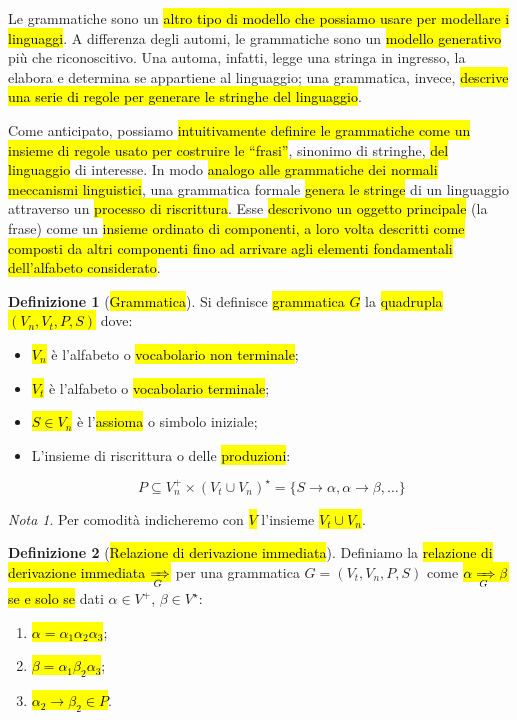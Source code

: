 \documentclass[a4paper,11pt,twoside]{article}
\theoremstyle{plain}
\theoremstyle{definition}
\newtheorem{defn}{Definizione}[section]
\theoremstyle{remark}
\newtheorem*{nota}{Nota}
\newcommand*{\deriv}[1][]{\xRightarrow[#1]{}}
\begin{document}
Le grammatiche sono un \hl{altro tipo di modello che possiamo usare per
modellare i linguaggi}. A differenza degli automi, le grammatiche sono un
\hl{modello generativo} più che riconoscitivo. Una automa, infatti, legge una
stringa in ingresso, la elabora e determina se appartiene al linguaggio; una
grammatica, invece, \hl{descrive una serie di regole per generare le stringhe
del linguaggio}.

Come anticipato, possiamo \hl{intuitivamente definire le grammatiche come un
insieme di regole usato per costruire le ``frasi''}, sinonimo di stringhe,
\hl{del linguaggio} di interesse. In modo \hl{analogo alle grammatiche dei
normali meccanismi linguistici}, una grammatica formale \hl{genera le stringe}
di un linguaggio attraverso un \hl{processo di riscrittura}. Esse \hl{descrivono
un oggetto principale} (la frase) come un \hl{insieme ordinato di componenti, a
loro volta descritti come composti da altri componenti fino ad arrivare agli
elementi fondamentali dell'alfabeto considerato}.

\begin{defn}[\hl{Grammatica}]\label{def:grammatica}
  Si definisce \hl{grammatica $G$} la \hl{quadrupla $(V_n, V_t, P, S)$} dove:

  \begin{itemize}
    \item \hl{$V_n$} è l'alfabeto o \hl{vocabolario non terminale};
    \item \hl{$V_t$} è l'alfabeto o \hl{vocabolario terminale};
    \item \hl{$S \in V_n$} è l'\hl{assioma} o simbolo iniziale;
    \item L'insieme di riscrittura o delle \hl{produzioni}:

      \begin{equation}
        P \subseteq V_n^+ \times {(V_t \cup V_n)}^\star =
          \{S \to \alpha, \alpha \to \beta, \ldots\}
      \end{equation}

  \end{itemize}
\end{defn}

\begin{nota}
  Per comodità indicheremo con \hl{$V$} l'insieme \hl{$V_t \cup V_n$}.
\end{nota}

\begin{defn}[\hl{Relazione di derivazione immediata}]\label{def:deriv}
  Definiamo la \hl{relazione di derivazione immediata $\deriv[G]$} per una
  grammatica $G = (V_t, V_n, P, S)$ come \hl{$\alpha \deriv[G] \beta$ se e solo
  se} dati $\alpha \in V^+$, $\beta \in V^\star$:

  \begin{enumerate}
    \item \hl{$\alpha = \alpha_1 \alpha_2 \alpha_3$};
    \item \hl{$\beta = \alpha_1 \beta_2 \alpha_3$};
    \item \hl{$\alpha_2 \to \beta_2 \in P$}.
  \end{enumerate}
\end{defn}
\end{document}
